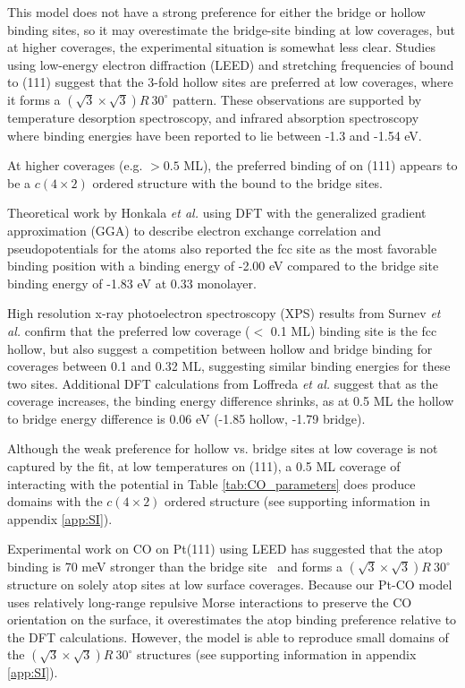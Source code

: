 This  model does not have a strong preference for
either the bridge or hollow binding sites, so it may overestimate the
bridge-site binding at low coverages, but at higher coverages, the
experimental situation is somewhat less clear.\citep{Wong:1991ta}
Studies using low-energy electron diffraction (LEED) and
 stretching frequencies of  bound to
(111) suggest that the 3-fold hollow sites are preferred at low
coverages,\citep{Bradshaw:1978uf, Conrad:1978fx, Ohtani:1987zh} where it
forms a $(\sqrt{3} \times \sqrt{3}) R~30^{\circ}$ pattern.  These
observations are supported by temperature desorption
spectroscopy,\citep{Guo:1989aa} and infrared absorption
spectroscopy~\citep{Szanyi:1992aa} where binding energies have been
reported to lie between -1.3 and -1.54 eV.

At higher  coverages (e.g. $> 0.5$ ML), the preferred binding
of  on (111) appears to be a $c(4\times2)$ ordered
structure with the  bound to the bridge
sites.\citep{Bradshaw:1978uf} 

Theoretical work by Honkala \textit{et al.}\citep{Honkala:2001sf} using
DFT with the generalized gradient approximation (GGA) to describe
electron exchange correlation and pseudopotentials for the 
atoms also reported the fcc site as the most favorable binding
position with a binding energy of -2.00 eV compared to the bridge site
binding energy of -1.83 eV at 0.33 monolayer.

High resolution x-ray photoelectron spectroscopy (XPS) results from
Surnev \textit{et al.}\citep{Surnev:2000uk} confirm that the preferred
low coverage ($< $ 0.1 ML) binding site is the fcc hollow, but also
suggest a competition between hollow and bridge binding for coverages
between 0.1 and 0.32 ML, suggesting similar binding energies for these
two sites. Additional DFT calculations from Loffreda \textit{et
al.}\citep{Loffreda:1999vl} suggest that as the coverage increases, the
binding energy difference shrinks, as at 0.5 ML the hollow to bridge
energy difference is 0.06 eV (-1.85 hollow, -1.79 bridge).

Although the weak preference for hollow vs. bridge sites at low
coverage is not captured by the  fit, at low
temperatures on (111), a 0.5 ML coverage of  interacting
with the potential in Table \ref{tab:CO_parameters} does produce
domains with the $c(4\times2)$ ordered structure (see supporting
information in appendix \ref{app:SI}).

Experimental work on CO on Pt(111) using LEED has suggested that the
atop binding is 70 meV stronger than the bridge
site~\citep{Schweizer:1989fk} and forms a
$(\sqrt{3} \times \sqrt{3}) R~30^{\circ}$ structure on solely atop
sites at low surface coverages.\citep{Kelemen:1979ad} Because our Pt-CO
model uses relatively long-range repulsive Morse interactions to
preserve the CO orientation on the surface, it overestimates the atop
binding preference relative to the DFT calculations.  However, the
model is able to reproduce small domains of the
$(\sqrt{3} \times \sqrt{3}) R~30^{\circ}$ structures (see supporting
information in appendix \ref{app:SI}).

